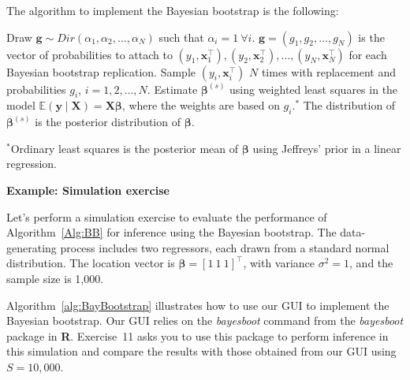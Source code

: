The algorithm to implement the Bayesian bootstrap is the following:
\begin{algorithm}[!h]
	\caption{Bayesian bootstrap from scratch in linear regression}
	\label{Alg:BB}
	\begin{algorithmic}[1]
		\State Draw $\bm{g}\sim Dir(\alpha_1,\alpha_2,\dots,\alpha_N)$ such that $\alpha_i=1 \ \forall i$.
		\State $\bm{g}=(g_1,g_2,\dots,g_N)$ is the vector of probabilities to attach to $(y_1,\bm{x}_1^{\top}),(y_2,\bm{x}_2^{\top}),\dots,(y_N,\bm{x}_N^{\top})$ for each Bayesian bootstrap replication.
			\State Sample $(y_i,\bm{x}_i^{\top})$ $N$ times with replacement and probabilities $g_i$, $i=1,2,\dots,N$.
			\State Estimate $\bm{\beta}^{(s)}$ using weighted least squares in the model $\mathbb{E}(\bm{y}\mid \bm{X})=\bm{X}\bm{\beta}$, where the weights are based on $g_i$.$^*$ 
		\EndFor
		\State The distribution of $\bm{\beta}^{(s)}$ is the posterior distribution of $\bm{\beta}$.		
	\end{algorithmic}
	$^*${\footnotesize{Ordinary least squares is the posterior mean of $\bm{\beta}$ using Jeffreys' prior in a linear regression.}}
\end{algorithm}

\textbf{Example: Simulation exercise}

Let's perform a simulation exercise to evaluate the performance of Algorithm~\ref{Alg:BB} for inference using the Bayesian bootstrap. The data-generating process includes two regressors, each drawn from a standard normal distribution. The location vector is $\bm{\beta} = [1 \ 1 \ 1]^{\top}$, with variance $\sigma^2 = 1$, and the sample size is 1,000.

Algorithm~\ref{alg:BayBootstrap} illustrates how to use our GUI to implement the Bayesian bootstrap. Our GUI relies on the \textit{bayesboot} command from the \textit{bayesboot} package in \textbf{R}. Exercise~11 asks you to use this package to perform inference in this simulation and compare the results with those obtained from our GUI using $S = 10{,}000$.

